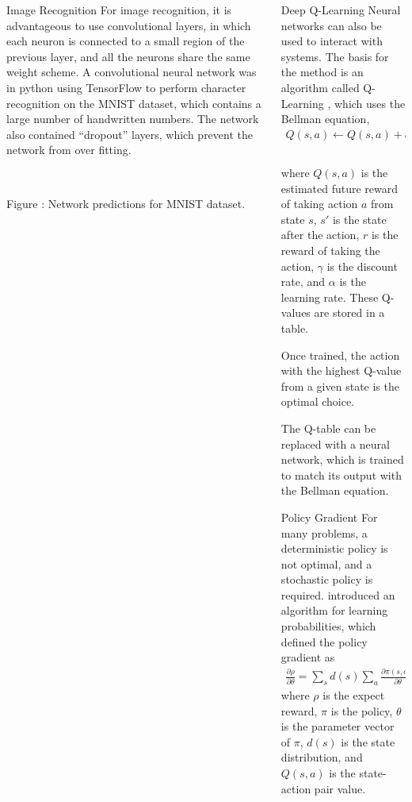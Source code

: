 \documentclass[final]{beamer}
\newcommand{\rfig}[3][1em]{%
    \refstepcounter{figure}
    \vspace{1cm}
    \begin{center}
        #2
        \vspace{#1}\\
        \parbox{0.8\columnwidth}{\centering Figure \thefigure: #3}
    \end{center}
    \vspace{1cm}
}
\begin{document}
\begin{frame}[t]
\begin{columns}
\begin{column}[t]{0.3\textwidth}
\begin{block}{Image Recognition}
        For image recognition, it is advantageous to use convolutional layers,
        in which each neuron is connected to a small region of the previous
        layer, and all the neurons share the same weight scheme.
        A convolutional neural network was in python using TensorFlow to perform
        character recognition on the MNIST dataset, which contains a large
        number of handwritten numbers.
        The network also contained ``dropout'' layers, which prevent the network
        from over fitting.
        \rfig{}{%
            Network predictions for MNIST dataset.
        }
    \end{block}

\end{column}
\begin{column}[t]{0.3\textwidth}

    \begin{block}{Deep Q-Learning}
        Neural networks can also be used to interact with systems.
        The basis for the method is an algorithm called Q-Learning
        \citep{Watkins:1989:Learning}, which uses the Bellman equation,
        \begin{align*}
            Q(s,a) \leftarrow Q(s,a)
            + \alpha (&r + \gamma\max_{a'}Q(s',a')\\ &- Q(s,a)),
        \end{align*}
        where $Q(s,a)$ is the estimated future reward of taking action $a$ from
        state $s$, $s'$ is the state after the action,  $r$ is the reward of
        taking the action, $\gamma$ is the discount rate, and $\alpha$ is the
        learning rate.
        These Q-values are stored in a table.

        Once trained, the action with the highest Q-value from a given state is
        the optimal choice.

        The Q-table can be replaced with a neural network, which is trained to
        match its output with the Bellman equation.
    \end{block}
    \vspace{1cm}

    \begin{block}{Policy Gradient}
        For many problems, a deterministic policy is not optimal, and a
        stochastic policy is required.
        \cite{Sutton:2000:Policy} introduced an algorithm for learning
        probabilities, which defined the policy gradient as
        \begin{align*}
            \frac{\partial\rho}{\partial\theta} = \sum_s d(s) \sum_a
            \frac{\partial\pi(s,a)}{\partial\theta}Q(s,a),
        \end{align*}
        where $\rho$ is the expect reward, $\pi$ is the policy, $\theta$ is the
        parameter vector of $\pi$, $d(s)$ is the state distribution, and
        $Q(s,a)$ is the state-action pair value.


\end{block}
\end{column}
\end{columns}
\end{frame}
\end{document}
